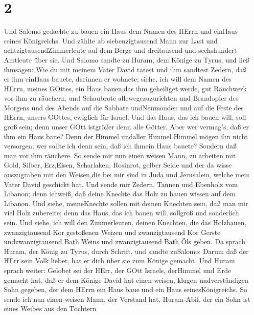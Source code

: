\hypertarget{section-1}{%
\section{2}\label{section-1}}

 Und Salomo gedachte zu bauen ein Haus dem Namen des HErrn
und einHaus seines Königreichs.  Und zählte ab
siebenzigtausend Mann zur Last und achtzigtausendZimmerleute auf dem
Berge und dreitausend und sechshundert Amtleute über sie. 
Und Salomo sandte zu Huram, dem Könige zu Tyrus, und ließ ihmsagen: Wie
du mit meinem Vater David tatest und ihm sandtest Zedern, daß er ihm
einHaus bauete, darinnen er wohnete;  siehe, ich will dem
Namen des HErrn, meines GOttes, ein Haus bauen,das ihm geheiliget werde,
gut Räuchwerk vor ihm zu räuchern, und Schaubrote allewegezuzurichten
und Brandopfer des Morgens und des Abends auf die Sabbate undNeumonden
und auf die Feste des HErrn, unsers GOttes, ewiglich für Israel.
 Und das Haus, das ich bauen will, soll groß sein; denn
unser GOtt istgrößer denn alle Götter.  Aber wer vermag's,
daß er ihm ein Haus baue? Denn der Himmel undaller Himmel Himmel mögen
ihn nicht versorgen; wer sollte ich denn sein, daß ich ihmein Haus
bauete? Sondern daß man vor ihm räuchere.  So sende mir nun
einen weisen Mann, zu arbeiten mit Gold, Silber, Erz,Eisen, Scharlaken,
Rosinrot, gelber Seide und der da wisse auszugraben mit den Weisen,die
bei mir sind in Juda und Jerusalem, welche mein Vater David geschickt
hat.  Und sende mir Zedern, Tannen und Ebenholz vom Libanon;
denn ichweiß, daß deine Knechte das Holz zu hauen wissen auf dem
Libanon. Und siehe, meineKnechte sollen mit deinen Knechten sein,
 daß man mir viel Holz zubereite; denn das Haus, das ich
bauen will, sollgroß und sonderlich sein.  Und siehe, ich
will den Zimmerleuten, deinen Knechten, die das Holzhauen,
zwanzigtausend Kor gestoßenen Weizen und zwanzigtausend Kor Gerste
undzwanzigtausend Bath Weins und zwanzigtausend Bath Öls geben.
 Da sprach Huram, der König zu Tyrus, durch Schrift, und
sandte zuSalomo: Darum daß der HErr sein Volk liebet, hat er dich über
sie zum Könige gemacht.  Und Huram sprach weiter: Gelobet
sei der HErr, der GOtt Israels, derHimmel und Erde gemacht hat, daß er
dem Könige David hat einen weisen, klugen undverständigen Sohn gegeben,
der dem HErrn ein Haus baue und ein Haus seinesKönigreichs.
 So sende ich nun einen weisen Mann, der Verstand hat,
Huram-Abif,  der ein Sohn ist eines Weibes aus den Töchtern
